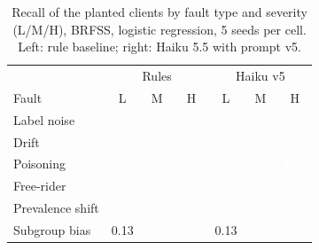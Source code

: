 \begin{table}[t]
\centering
\small
\setlength{\tabcolsep}{3pt}
\caption{Recall of the planted clients by fault type and severity (L/M/H), BRFSS, logistic regression, 5 seeds per cell. Left: rule baseline; right: Haiku 5.5 with prompt v5.}
\label{tab:recall}
\begin{tabular}{l|ccc|ccc}
\toprule
 & \multicolumn{3}{c}{Rules} & \multicolumn{3}{c}{Haiku v5} \\
Fault & L & M & H & L & M & H \\
\midrule
Label noise & \cellcolor[RGB]{13,54,107}\textcolor{white}{1.00} & \cellcolor[RGB]{13,54,107}\textcolor{white}{1.00} & \cellcolor[RGB]{13,54,107}\textcolor{white}{1.00} & \cellcolor[RGB]{13,54,107}\textcolor{white}{1.00} & \cellcolor[RGB]{13,54,107}\textcolor{white}{1.00} & \cellcolor[RGB]{13,54,107}\textcolor{white}{1.00} \\
Drift & \cellcolor[RGB]{22,74,141}\textcolor{white}{0.87} & \cellcolor[RGB]{13,54,107}\textcolor{white}{1.00} & \cellcolor[RGB]{13,54,107}\textcolor{white}{1.00} & \cellcolor[RGB]{45,118,206}\textcolor{white}{0.60} & \cellcolor[RGB]{13,54,107}\textcolor{white}{1.00} & \cellcolor[RGB]{13,54,107}\textcolor{white}{1.00} \\
Poisoning & \cellcolor[RGB]{13,54,107}\textcolor{white}{1.00} & \cellcolor[RGB]{13,54,107}\textcolor{white}{1.00} & \cellcolor[RGB]{13,54,107}\textcolor{white}{1.00} & \cellcolor[RGB]{17,64,124}\textcolor{white}{0.93} & \cellcolor[RGB]{13,54,107}\textcolor{white}{1.00} & \cellcolor[RGB]{13,54,107}\textcolor{white}{1.00} \\
Free-rider & \cellcolor[RGB]{13,54,107}\textcolor{white}{1.00} & \cellcolor[RGB]{13,54,107}\textcolor{white}{1.00} & \cellcolor[RGB]{13,54,107}\textcolor{white}{1.00} & \cellcolor[RGB]{22,74,141}\textcolor{white}{0.87} & \cellcolor[RGB]{13,54,107}\textcolor{white}{1.00} & \cellcolor[RGB]{13,54,107}\textcolor{white}{1.00} \\
Prevalence shift & \cellcolor[RGB]{27,84,157}\textcolor{white}{0.80} & \cellcolor[RGB]{13,54,107}\textcolor{white}{1.00} & \cellcolor[RGB]{13,54,107}\textcolor{white}{1.00} & \cellcolor[RGB]{22,74,141}\textcolor{white}{0.87} & \cellcolor[RGB]{13,54,107}\textcolor{white}{1.00} & \cellcolor[RGB]{13,54,107}\textcolor{white}{1.00} \\
Subgroup bias & \cellcolor[RGB]{167,203,245}0.13 & \cellcolor[RGB]{45,118,206}\textcolor{white}{0.60} & \cellcolor[RGB]{17,64,124}\textcolor{white}{0.93} & \cellcolor[RGB]{167,203,245}0.13 & \cellcolor[RGB]{13,54,107}\textcolor{white}{1.00} & \cellcolor[RGB]{13,54,107}\textcolor{white}{1.00} \\

\end{tabular}
\end{table}
